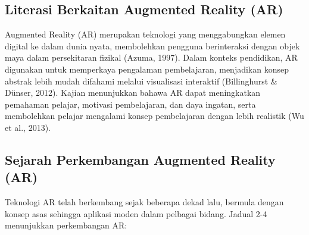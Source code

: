 \subsection{Literasi Berkaitan Augmented Reality (AR)}
Augmented Reality (AR) merupakan teknologi yang menggabungkan elemen digital ke dalam dunia nyata, membolehkan pengguna berinteraksi dengan objek maya dalam persekitaran fizikal (Azuma, 1997). Dalam konteks pendidikan, AR digunakan untuk memperkaya pengalaman pembelajaran, menjadikan konsep abstrak lebih mudah difahami melalui visualisasi interaktif (Billinghurst \& Dünser, 2012). Kajian menunjukkan bahawa AR dapat meningkatkan pemahaman pelajar, motivasi pembelajaran, dan daya ingatan, serta membolehkan pelajar mengalami konsep pembelajaran dengan lebih realistik (Wu et al., 2013).

\subsection{Sejarah Perkembangan Augmented Reality (AR)}
Teknologi AR telah berkembang sejak beberapa dekad lalu, bermula dengan konsep asas sehingga aplikasi moden dalam pelbagai bidang. Jadual 2-4 menunjukkan perkembangan AR:

